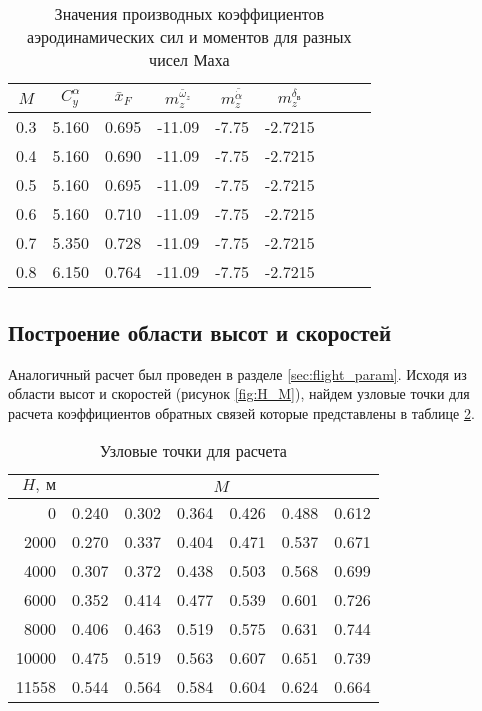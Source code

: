 \begin{table}[H]
\centering
\caption{Значения производных коэффициентов аэродинамических сил и моментов для разных чисел Маха}
\label{tab:aero_coeff}
\begin{tabular}{|c|c|c|c|c|c|c|c|c|}
\hline
$M$ & $C_y^\alpha$ & $\bar{x}_{F}$ & $m_z^{\bar{\omega}_z}$ & $m_{z}^{\bar{\dot{\alpha}}}$ & $m_z^{\delta_в}$ \\
\hline
0.3 &        5.160 &         0.695 &                 -11.09 &                        -7.75 &          -2.7215 \\
0.4 &        5.160 &         0.690 &                 -11.09 &                        -7.75 &          -2.7215 \\
0.5 &        5.160 &         0.695 &                 -11.09 &                        -7.75 &          -2.7215 \\
0.6 &        5.160 &         0.710 &                 -11.09 &                        -7.75 &          -2.7215 \\
0.7 &        5.350 &         0.728 &                 -11.09 &                        -7.75 &          -2.7215 \\
0.8 &        6.150 &         0.764 &                 -11.09 &                        -7.75 &          -2.7215 \\
\hline
\end{tabular}
\end{table}

\subsection{Построение области высот и скоростей}
Аналогичный расчет был проведен в разделе \ref{sec:flight_param}. 
Исходя из области высот и скоростей (рисунок \ref{fig:H_M}), найдем узловые
точки для расчета коэффициентов обратных связей которые представлены в таблице
\ref{tab:fa}.

\begin{table}[H]
    \centering
    \caption{Узловые точки для расчета}
    \label{tab:fa}
\begin{tabular}{|r|rrrrrr|}
    \hline
    $H,\ м$ & \multicolumn{6}{c|}{$M$}\\
\hline
0 & 0.240 & 0.302 & 0.364 & 0.426 & 0.488 & 0.612 \\
\hline
2000 & 0.270 & 0.337 & 0.404 & 0.471 & 0.537 & 0.671 \\
\hline
4000 & 0.307 & 0.372 & 0.438 & 0.503 & 0.568 & 0.699 \\
\hline
6000 & 0.352 & 0.414 & 0.477 & 0.539 & 0.601 & 0.726 \\
\hline
8000 & 0.406 & 0.463 & 0.519 & 0.575 & 0.631 & 0.744 \\
\hline
10000 & 0.475 & 0.519 & 0.563 & 0.607 & 0.651 & 0.739 \\
\hline
11558 & 0.544 & 0.564 & 0.584 & 0.604 & 0.624 & 0.664 \\
\hline
\end{tabular}
\end{table}

